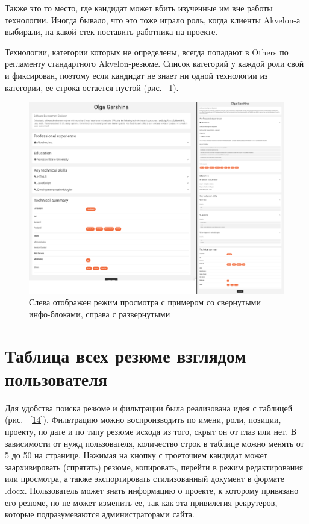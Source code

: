 \documentclass[a4paper,12pt]{diplom}
\begin{document}
Также это то место, где кандидат может вбить изученные им вне работы технологии. Иногда бывало, что это тоже играло роль, когда клиенты Akvelon-а выбирали, на какой стек поставить работника на проекте.

Технологии, категории которых не определены, всегда попадают в Others по регламенту стандартного Akvelon-резюме. Список категорий у каждой роли свой и фиксирован, поэтому если кандидат не знает ни одной технологии из категории, ее строка остается пустой (рис. ~\ref{13}).
\begin{figure}[!ht]
\centering
\includegraphics[width=1\textwidth]{resources/expand.png}
\caption{Слева отображен режим просмотра с примером со свернутыми инфо-блоками, справа с развернутыми}
\label{13}
\end{figure}
\section{Таблица всех резюме взглядом пользователя}

Для удобства поиска резюме и фильтрации была реализована идея с таблицей (рис. ~\ref{14}). Фильтрацию можно воспроизводить по имени, роли, позиции,
проекту, по дате и по типу резюме исходя из того, скрыт он от глаз или нет. В зависимости от нужд пользователя, количество строк в таблице можно менять от 5 до 50 на странице.
Нажимая на кнопку с троеточием кандидат может заархивировать (спрятать) резюме, копировать, перейти в режим редактирования или просмотра, а также экспортировать
стилизованный документ в формате .docx. Пользователь может знать информацию о проекте, к которому привязано его резюме, но не может изменить ее, так как эта привилегия рекрутеров, которые подразумеваются
администраторами сайта.
\end{document}
